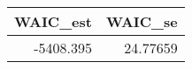 \begin{longtable}{rr}
\toprule
WAIC\_est & WAIC\_se \\ 
\midrule
-5408.395 & 24.77659 \\ 
\bottomrule
\end{longtable}

